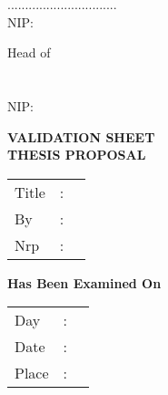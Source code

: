 {\begin{enumerate}
{		\item \PjTiga \hfill ...............................\\NIP:\NipPjTiga\vfill}{}
	\end{enumerate}
	\vfill
	\begin{center}
		Head of \Dep \\
		\fak\\
		\vspace{9ex}
		\underline{\NmKaDep}\\
		NIP:\NipKaDep
	\end{center}
	\newpage
}
{
	\begin{center}
		\textbf{VALIDATION SHEET\\
			THESIS PROPOSAL}\\
	\end{center}
	\vspace{5ex}
	\begin{tabular}{p{2cm} c p{8cm}}
		Title & : & \JdTesisEng    \\
		By    & : & \NamaMahasiswa \\
		Nrp   & : & \NrpMahasiswa
	\end{tabular}
	\vspace{5ex}
	\begin{center}
		\textbf{Has Been Examined On}
	\end{center}
	\begin{tabular}{p{2cm} c p{8cm}}
		Day   & : & \bHariUjian   \\
		Date  & : & \TglUjian     \\
		Place & : & \bTempatUjian
	\end{tabular}
	\vspace{5ex}

}
